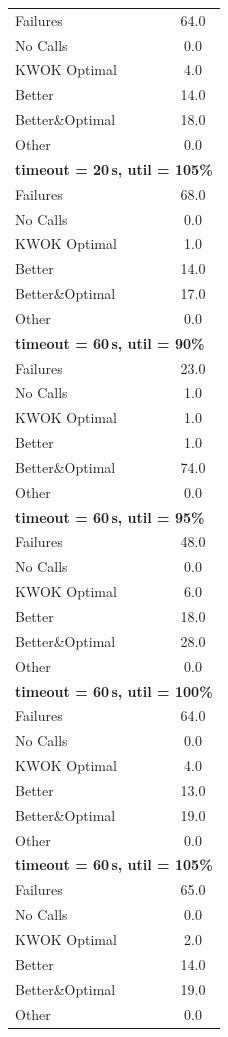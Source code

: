 \begin{tabular}{l c}
\midrule
Failures & 64.0 \\
No Calls & 0.0 \\
KWOK Optimal & 4.0 \\
Better & 14.0 \\
Better\&Optimal & 18.0 \\
Other & 0.0 \\
\midrule
\multicolumn{2}{l}{\textbf{timeout = 20\,s, util = 105\%}} \\
\midrule
Failures & 68.0 \\
No Calls & 0.0 \\
KWOK Optimal & 1.0 \\
Better & 14.0 \\
Better\&Optimal & 17.0 \\
Other & 0.0 \\
\midrule
\multicolumn{2}{l}{\textbf{timeout = 60\,s, util = 90\%}} \\
\midrule
Failures & 23.0 \\
No Calls & 1.0 \\
KWOK Optimal & 1.0 \\
Better & 1.0 \\
Better\&Optimal & 74.0 \\
Other & 0.0 \\
\midrule
\multicolumn{2}{l}{\textbf{timeout = 60\,s, util = 95\%}} \\
\midrule
Failures & 48.0 \\
No Calls & 0.0 \\
KWOK Optimal & 6.0 \\
Better & 18.0 \\
Better\&Optimal & 28.0 \\
Other & 0.0 \\
\midrule
\multicolumn{2}{l}{\textbf{timeout = 60\,s, util = 100\%}} \\
\midrule
Failures & 64.0 \\
No Calls & 0.0 \\
KWOK Optimal & 4.0 \\
Better & 13.0 \\
Better\&Optimal & 19.0 \\
Other & 0.0 \\
\midrule
\multicolumn{2}{l}{\textbf{timeout = 60\,s, util = 105\%}} \\
\midrule
Failures & 65.0 \\
No Calls & 0.0 \\
KWOK Optimal & 2.0 \\
Better & 14.0 \\
Better\&Optimal & 19.0 \\
Other & 0.0 \\
\bottomrule
\end{tabular}
